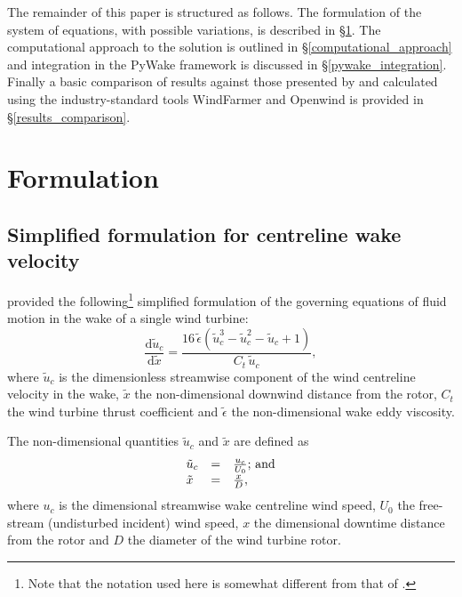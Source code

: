 \documentclass[11pt,a4paper]{article}
\begin{document}
The remainder of this paper is structured as follows. The formulation of the system of equations, with possible variations, is described in §\ref{formulation}. The computational approach to the solution is outlined in §\ref{computational_approach} and integration in the PyWake framework is discussed in §\ref{pywake_integration}. Finally a basic comparison of results against those presented by \textcite{Anderson_2011} and calculated using the industry-standard tools WindFarmer and Openwind is provided in §\ref{results_comparison}.

\section{Formulation}\label{formulation}

\subsection{Simplified formulation for centreline wake velocity}\label{wake_velocity_formulation}

\textcite{Anderson_2011} provided the following\footnote{Note that the notation used here is somewhat different from that of \textcite{Anderson_2011}.} simplified formulation of the governing equations of fluid motion in the wake of a single wind turbine:
\begin{equation}\label{eq:gov_uc}
\frac{\textrm{d}\tilde{u}_{c}}{\textrm{d}\tilde{x}} =
  \frac{16 \, \tilde{\epsilon} \left( \tilde{u}_{c}^{3} - \tilde{u}_{c}^{2} - \tilde{u}_{c} + 1 \right)}{C_{t} \, \tilde{u}_{c}},
\end{equation}
where $\tilde{u}_{c}$ is the dimensionless streamwise component of the wind centreline velocity in the wake, $\tilde{x}$ the non-dimensional downwind distance from the rotor, $C_{t}$ the wind turbine thrust coefficient and $\tilde{\epsilon}$ the non-dimensional wake eddy viscosity.

The non-dimensional quantities $\tilde{u}_{c}$ and $\tilde{x}$ are defined as
\begin{equation}
\begin{array}{ l l l }
  \tilde{u}_{c} & = & \frac{u_{c}}{U_{0}} \textrm{; and} \\
  \tilde{x}     & = & \frac{x}{D},
\end{array}
\end{equation}
where $u_{c}$ is the dimensional streamwise wake centreline wind speed, $U_{0}$ the free-stream (undisturbed incident) wind speed, $x$ the dimensional downtime distance from the rotor and $D$ the diameter of the wind turbine rotor.
\end{document}
